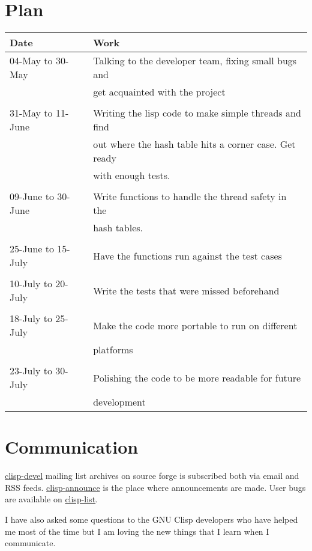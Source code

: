 \documentclass[11pt]{article}
\begin{document}
\section{Plan}
\label{sec:org5c908e1}
\begin{center}
\begin{tabular}{ll}
Date & Work\\
\hline
04-May to 30-May & Talking to the developer team, fixing small bugs and\\
 & get acquainted with the project\\
 & \\
31-May to 11-June & Writing the lisp code to make simple threads and find\\
 & out where the hash table hits a corner case. Get ready\\
 & with enough tests.\\
 & \\
09-June to 30-June & Write functions to handle the thread safety in the\\
 & hash tables.\\
 & \\
25-June to 15-July & Have the functions run against the test cases\\
 & \\
10-July to 20-July & Write the tests that were missed beforehand\\
 & \\
18-July to 25-July & Make the code more portable to run on different\\
 & platforms\\
 & \\
23-July to 30-July & Polishing the code to be more readable for future\\
 & development\\
\end{tabular}
\end{center}
\section{Communication}
\label{sec:org4ae0a08}
\href{https://sourceforge.net/p/clisp/mailman/clisp-devel/}{clisp-devel} mailing list archives on source forge is subscribed both via email
and RSS feeds. \href{https://sourceforge.net/p/clisp/mailman/clisp-announce/}{clisp-announce} is the place where announcements are made.
User bugs are available on \href{https://sourceforge.net/p/clisp/mailman/clisp-list/}{clisp-list}.

I have also asked some questions to the GNU Clisp developers who have helped me
most of the time but I am loving the new things that I learn when I communicate.
\end{document}
